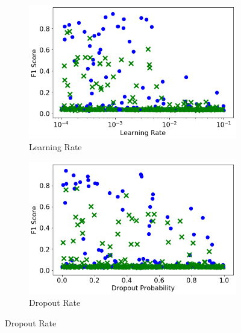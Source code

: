 \begin{figure}[H]
     \centering
     \begin{subfigure}[b]{0.49\textwidth}
         \centering
         \includegraphics[width=\textwidth]{images/dnn_learning_rate.png}
         \caption{Learning Rate}
         \label{fig:dnn_learning_rate}
     \end{subfigure}
     \hfill
     \begin{subfigure}[b]{0.49\textwidth}
         \centering
         \includegraphics[width=\textwidth]{images/dnn_dropout.png}
         \caption{Dropout Rate}
         \label{fig:dnn_dropout}
     \end{subfigure}


\end{figure}
